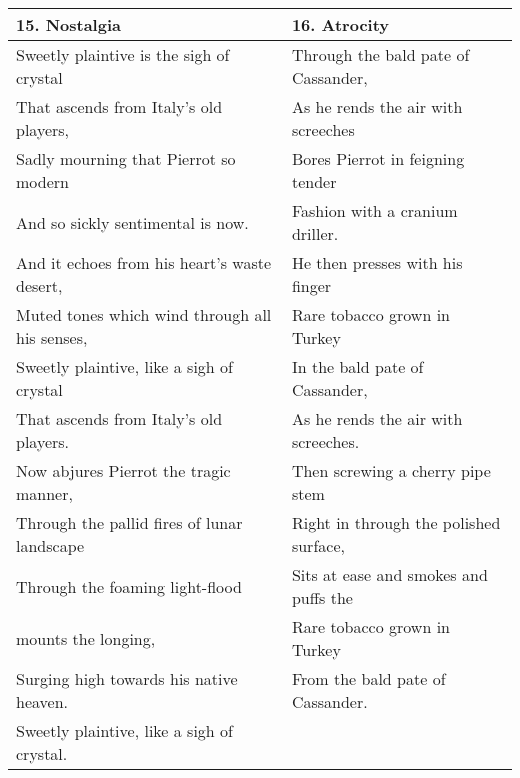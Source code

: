 \begin{table}[h!]
\begin{tabular}{p{8.0cm}|p{8.0cm}}
15. Nostalgia & 16. Atrocity \\\hline
Sweetly plaintive is the sigh of crystal & Through the bald pate of Cassander, \\
That ascends from Italy's old players, & As he rends the air with screeches \\
Sadly mourning that Pierrot so modern & Bores Pierrot in feigning tender \\
And so sickly sentimental is now. & Fashion with a cranium driller. \\
And it echoes from his heart's waste desert, & He then presses with his finger \\
Muted tones which wind through all his senses, & Rare tobacco grown in Turkey \\
Sweetly plaintive, like a sigh of crystal & In the bald pate of Cassander, \\
That ascends from Italy's old players. & As he rends the air with screeches. \\
Now abjures Pierrot the tragic manner, & Then screwing a cherry pipe stem \\
Through the pallid fires of lunar landscape & Right in through the polished surface, \\
Through the foaming light-flood & Sits at ease and smokes and puffs the \\
mounts the longing, & Rare tobacco grown in Turkey \\
Surging high towards his native heaven. & From the bald pate of Cassander. \\
Sweetly plaintive, like a sigh of crystal. &\\\hline



\end{tabular}
\end{table}
